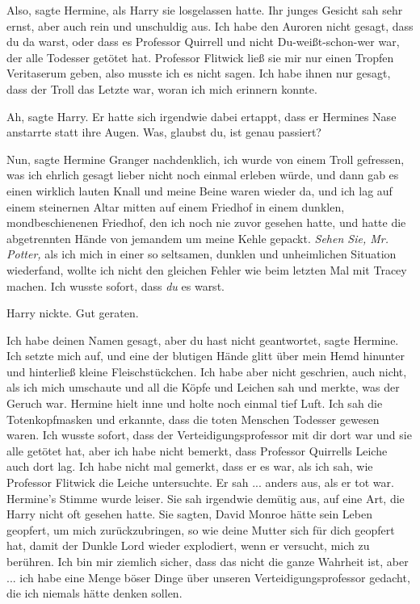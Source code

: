 \glqq{}Also\grqq{}, sagte Hermine, als Harry sie losgelassen hatte. Ihr junges
Gesicht sah sehr ernst, aber auch rein und unschuldig aus. \glqq{}Ich habe den
Auroren nicht gesagt, dass du da warst, oder dass es Professor Quirrell und
nicht Du-weißt-schon-wer war, der alle Todesser getötet hat. Professor Flitwick
ließ sie mir nur einen Tropfen Veritaserum geben, also musste ich es nicht
sagen. Ich habe ihnen nur gesagt, dass der Troll das Letzte war, woran ich mich
erinnern konnte.\grqq{}

\glqq{}Ah\grqq{}, sagte Harry. Er hatte sich irgendwie dabei ertappt, dass er
Hermines Nase anstarrte statt ihre Augen. \glqq{}Was, glaubst du, ist genau
passiert?\grqq{}

\glqq{}Nun\grqq{}, sagte Hermine Granger nachdenklich, \glqq{}ich wurde von einem
Troll gefressen, was ich ehrlich gesagt lieber nicht noch einmal erleben würde,
und dann gab es einen wirklich lauten Knall und meine Beine waren wieder da, und
ich lag auf einem steinernen Altar mitten auf einem Friedhof in einem dunklen,
mondbeschienenen Friedhof, den ich noch nie zuvor gesehen hatte, und hatte die
abgetrennten Hände von jemandem um meine Kehle gepackt. \emph{Sehen Sie, Mr.
Potter,} als ich mich in einer so seltsamen, dunklen und unheimlichen Situation
wiederfand, wollte ich nicht den gleichen Fehler wie beim letzten Mal mit Tracey
machen. Ich wusste sofort, dass \emph{du} es warst.\grqq{}

Harry nickte. \glqq{}Gut geraten.\grqq{}

\glqq{}Ich habe deinen Namen gesagt, aber du hast nicht geantwortet\grqq{}, sagte
Hermine. \glqq{}Ich setzte mich auf, und eine der blutigen Hände glitt über mein
Hemd hinunter und hinterließ kleine Fleischstückchen. Ich habe aber nicht
geschrien, auch nicht, als ich mich umschaute und all die Köpfe und Leichen sah
und merkte, was der Geruch war.\grqq{} Hermine hielt inne und holte noch einmal
tief Luft. \glqq{}Ich sah die Totenkopfmasken und erkannte, dass die toten
Menschen Todesser gewesen waren. Ich wusste sofort, dass der
Verteidigungsprofessor mit dir dort war und sie alle getötet hat, aber ich habe
nicht bemerkt, dass Professor Quirrells Leiche auch dort lag. Ich habe nicht mal
gemerkt, dass er es war, als ich sah, wie Professor Flitwick die Leiche
untersuchte. Er sah ... anders aus, als er tot war.\grqq{} Hermine's Stimme
wurde leiser. Sie sah irgendwie demütig aus, auf eine Art, die Harry nicht oft
gesehen hatte. \glqq{}Sie sagten, David Monroe hätte sein Leben geopfert, um mich
zurückzubringen, so wie deine Mutter sich für dich geopfert hat, damit der
Dunkle Lord wieder explodiert, wenn er versucht, mich zu berühren. Ich bin mir
ziemlich sicher, dass das nicht die ganze Wahrheit ist, aber ... ich habe eine
Menge böser Dinge über unseren Verteidigungsprofessor gedacht, die ich niemals
hätte denken sollen.\grqq{}

